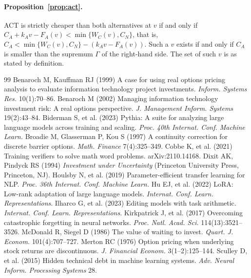 \documentclass[preprint,12pt,authoryear]{elsarticle}
\begin{document}
\paragraph{Proposition~\ref{prop:act}.} ACT is strictly cheaper than both alternatives at $v$ if and only if
$C_A+k_Av-F_A(v)<\min\{W_C(v),C_N\}$, that is, $C_A<\min\{W_C(v),C_N\}-(k_Av-F_A(v))$. Such a $v$ exists if and only if
$C_A$ is smaller than the supremum $\Gamma$ of the right-hand side. The set of such $v$ is as stated by definition.


\begin{thebibliography}{99}
Benaroch M, Kauffman RJ (1999) A case for using real options pricing analysis to evaluate information technology project investments. \emph{Inform. Systems Res.} 10(1):70--86.
Benaroch M (2002) Managing information technology investment risk: A real options perspective. \emph{J. Management Inform. Systems} 19(2):43--84.
Biderman S, et al. (2023) Pythia: A suite for analyzing large language models across training and scaling. \emph{Proc. 40th Internat. Conf. Machine Learn.}
Broadie M, Glasserman P, Kou S (1997) A continuity correction for discrete barrier options. \emph{Math. Finance} 7(4):325--349.
Cobbe K, et al. (2021) Training verifiers to solve math word problems. arXiv:2110.14168.
Dixit AK, Pindyck RS (1994) \emph{Investment under Uncertainty} (Princeton University Press, Princeton, NJ).
Houlsby N, et al. (2019) Parameter-efficient transfer learning for NLP. \emph{Proc. 36th Internat. Conf. Machine Learn.}
Hu EJ, et al. (2022) LoRA: Low-rank adaptation of large language models. \emph{Internat. Conf. Learn. Representations}.
Ilharco G, et al. (2023) Editing models with task arithmetic. \emph{Internat. Conf. Learn. Representations}.
Kirkpatrick J, et al. (2017) Overcoming catastrophic forgetting in neural networks. \emph{Proc. Natl. Acad. Sci.} 114(13):3521--3526.
McDonald R, Siegel D (1986) The value of waiting to invest. \emph{Quart. J. Econom.} 101(4):707--727.
Merton RC (1976) Option pricing when underlying stock returns are discontinuous. \emph{J. Financial Econom.} 3(1--2):125--144.
Sculley D, et al. (2015) Hidden technical debt in machine learning systems. \emph{Adv. Neural Inform. Processing Systems} 28.
\end{thebibliography}
\end{document}
